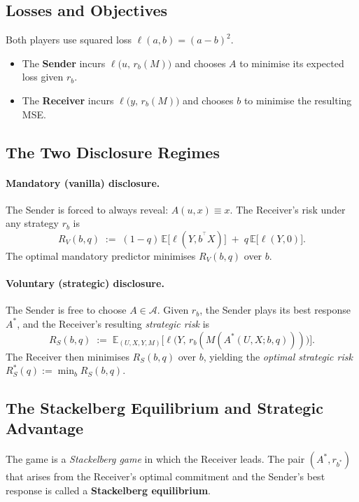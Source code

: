 \documentclass[11pt]{article}
\theoremstyle{definition}
\theoremstyle{remark}
\newcommand{\E}{\mathbb{E}}
\newcommand{\T}{^{\top}}
\begin{document}
\subsection{Losses and Objectives}

Both players use squared loss $\ell(a,b) = (a-b)^{2}$.
\begin{itemize}
  \item The \textbf{Sender} incurs $\ell\bigl(u,\, r_{b}(M)\bigr)$ and chooses $A$ to
        minimise its expected loss given $r_{b}$.
  \item The \textbf{Receiver} incurs $\ell\bigl(y,\, r_{b}(M)\bigr)$ and chooses $b$ to
        minimise the resulting MSE.
\end{itemize}

\subsection{The Two Disclosure Regimes}

\paragraph{Mandatory (vanilla) disclosure.}
The Sender is forced to always reveal: $A(u,x)\equiv x$.
The Receiver's risk under any strategy $r_{b}$ is
\[
  R_{V}(b,q)
  \;:=\;
  (1-q)\,\E\bigl[\ell(Y,b^{\T}X)\bigr]
  \;+\;
  q\,\E\bigl[\ell(Y,0)\bigr].
\]
The optimal mandatory predictor minimises $R_{V}(b,q)$ over $b$.

\paragraph{Voluntary (strategic) disclosure.}
The Sender is free to choose $A \in \mathcal{A}$.
Given $r_{b}$, the Sender plays its best response $A^{*}$, and the Receiver's resulting
\emph{strategic risk} is
\[
  R_{S}(b,q)
  \;:=\;
  \E_{(U,X,Y,M)}\!\bigl[\ell\bigl(Y,\,r_{b}(M(A^{*}(U,X;b,q)))\bigr)\bigr].
\]
The Receiver then minimises $R_{S}(b,q)$ over $b$, yielding the
\emph{optimal strategic risk} $R_{S}^{*}(q) := \min_{b} R_{S}(b,q)$.

\subsection{The Stackelberg Equilibrium and Strategic Advantage}

The game is a \emph{Stackelberg game} in which the Receiver leads.
The pair $(A^{*}, r_{b^{*}})$ that arises from the Receiver's optimal commitment and the
Sender's best response is called a \textbf{Stackelberg equilibrium}.
\end{document}
